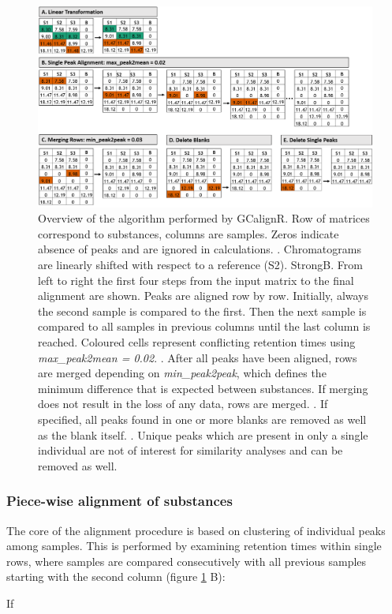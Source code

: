 \newpage

\begin{figure}[htbp]
  \centering
  \includegraphics[width=13cm]{figures/algorithm}
  \caption{Overview of the algorithm performed by GCalignR. Row of matrices correspond to substances, columns are samples. Zeros indicate absence of peaks and are ignored in calculations. . Chromatograms are linearly shifted with respect to a reference (S2). Strong{B}. From left to right the first four steps from the input matrix to the final alignment are shown. Peaks are aligned row by row. Initially, always the second sample is compared to the first. Then the next sample is compared to all samples in previous columns until the last column is reached. Coloured cells represent conflicting retention times using \textit{max{\_}peak2mean = 0.02}. . After all peaks have been aligned, rows are merged depending on \textit{min{\_}peak2peak}, which defines the minimum difference that is expected between substances. If merging does not result in the loss of any data, rows are merged. . If specified, all peaks found in one or more blanks are removed as well as the blank itself. . Unique peaks which are present in only a single individual are not of interest for similarity analyses and can be removed as well.}
  \label{figure:algorithm}
\end{figure}

\subsubsection{Piece-wise alignment of substances}

The core of the alignment procedure is based on clustering of individual
peaks among samples. This is performed by examining retention times
within single rows, where samples are compared consecutively with all
previous samples starting with the second column (figure
\ref{figure:algorithm} B):\par
If

